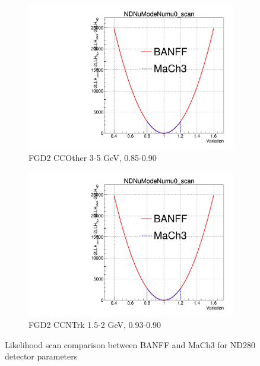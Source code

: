 \begin{figure}[h]
\begin{subfigure}[t]{0.24\textwidth}
	\end{subfigure}
	\begin{subfigure}[t]{0.24\textwidth}
		\includegraphics[width=\textwidth, trim={0mm 0mm 0mm 11mm}, clip, page=569]{figures/mach3/banff/Asimov_scan_20July_flux_Full_LLHscan_18July_BeRPA_U_ND280logL_scan}
		\caption{FGD2 CCOther 3-5 GeV, 0.85-0.90}
	\end{subfigure}
	\begin{subfigure}[t]{0.24\textwidth}
		\includegraphics[width=\textwidth, trim={0mm 0mm 0mm 11mm}, clip, page=682]{figures/mach3/banff/Asimov_scan_20July_flux_Full_LLHscan_18July_BeRPA_U_ND280logL_scan}
		\caption{FGD2 \numubar CCNTrk 1.5-2 GeV, 0.93-0.90}
	\end{subfigure}
	\caption{Likelihood scan comparison between BANFF and MaCh3 for ND280 detector parameters}
	\label{fig:banff_asimov_scan_ND280}
\end{figure}

